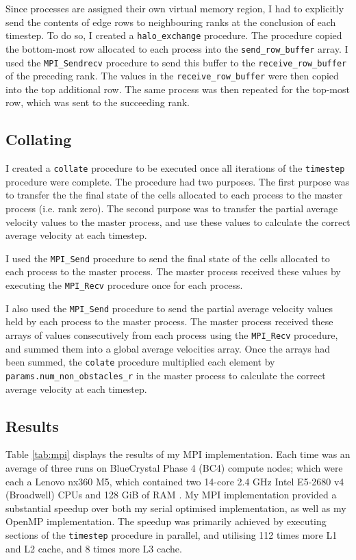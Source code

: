 \documentclass[twocolumn, a4paper]{article}
\begin{document}
Since processes are assigned their own virtual memory region, I had to explicitly send the contents of edge rows to neighbouring ranks at the conclusion of each timestep.
To do so, I created a \texttt{halo\_exchange} procedure.
The procedure copied the bottom-most row allocated to each process into the \texttt{send\_row\_buffer} array.
I used the \texttt{MPI\_Sendrecv} procedure to send this buffer to the \texttt{receive\_row\_buffer} of the preceding rank.
The values in the \texttt{receive\_row\_buffer} were then copied into the top additional row.
The same process was then repeated for the top-most row, which was sent to the succeeding rank.

\subsection{Collating}

I created a \texttt{collate} procedure to be executed once all iterations of the \texttt{timestep} procedure were complete.
The procedure had two purposes.
The first purpose was to transfer the the final state of the cells allocated to each process to the master process (i.e. rank zero).
The second purpose was to transfer the partial average velocity values to the master process, and use these values to calculate the correct average velocity at each timestep.

I used the \texttt{MPI\_Send} procedure to send the final state of the cells allocated to each process to the master process.
The master process received these values by executing the \texttt{MPI\_Recv} procedure once for each process.

I also used the \texttt{MPI\_Send} procedure to send the partial average velocity values held by each process to the master process.
The master process received these arrays of values consecutively from each process using the \texttt{MPI\_Recv} procedure, and summed them into a global average velocities array.
Once the arrays had been summed, the \texttt{colate} procedure multiplied each element by \texttt{params.num\_non\_obstacles\_r} in the master process to calculate the correct average velocity at each timestep.

\subsection{Results}

Table \ref{tab:mpi} displays the results of my MPI implementation.
Each time was an average of three runs on BlueCrystal Phase 4 (BC4) compute nodes; which were each a Lenovo nx360 M5, which contained two 14-core 2.4 GHz Intel E5-2680 v4 (Broadwell) CPUs and 128 GiB of RAM \cite{bcp4}.
My MPI implementation provided a substantial speedup over both my serial optimised implementation, as well as my OpenMP implementation.
The speedup was primarily achieved by executing sections of the \texttt{timestep} procedure in parallel, and utilising 112 times more L1 and L2 cache, and 8 times more L3 cache.
\end{document}
